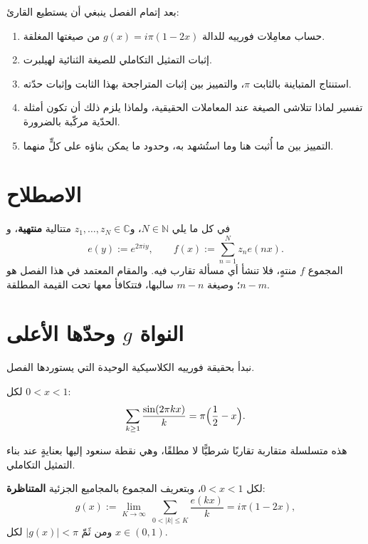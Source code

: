 بعد إتمام الفصل ينبغي أن يستطيع القارئ:
\begin{enumerate}
  \item حساب معامِلات فورييه للدالة \(g(x)=i\pi(1-2x)\) من صيغتها المغلقة.
  \item إثبات التمثيل التكاملي للصيغة الثنائية لهيلبرت.
  \item استنتاج المتباينة بالثابت \(\pi\)، والتمييز بين إثبات
  المتراجحة بهذا الثابت وإثبات حدّته.
  \item تفسير لماذا تتلاشى الصيغة عند المعاملات الحقيقية، ولماذا يلزم
  ذلك أن تكون أمثلة الحدّية مركّبة بالضرورة.
  \item التمييز بين ما أُثبت هنا وما استُشهد به، وحدود ما يمكن بناؤه على
  كلٍّ منهما.
\end{enumerate}

\section{الاصطلاح}

في كل ما يلي \(N\in\mathbb{N}\)، و\(z_1,\dots,z_N\in\mathbb{C}\) متتالية
\textbf{منتهية}، و
\[
e(y):=e^{2\pi iy},
\qquad
f(x):=\sum_{n=1}^{N}z_ne(nx).
\]
المجموع \(f\) منتهٍ، فلا تنشأ أي مسألة تقارب فيه. والمقام المعتمد في هذا
الفصل هو \(n-m\)؛ وصيغة \(m-n\) سالبها، فتتكافأ معها تحت القيمة المطلقة.

\section{النواة \texorpdfstring{\(g\)}{g} وحدّها الأعلى}

نبدأ بحقيقة فورييه الكلاسيكية الوحيدة التي يستوردها الفصل.

\begin{lemma}
\label{lem:ch58-sawtooth}
لكل \(0<x<1\):
\[
\sum_{k\ge1}\frac{\sin(2\pi kx)}{k}=\pi\Bigl(\frac12-x\Bigr).
\]
\end{lemma}

هذه متسلسلة متقاربة تقاربًا شرطيًّا لا مطلقًا، وهي نقطة سنعود إليها
بعنايةٍ عند بناء التمثيل التكاملي.

\begin{lemma}
\label{lem:ch58-kernel}
\provedhere
لكل \(0<x<1\)، وبتعريف المجموع بالمجاميع الجزئية \textbf{المتناظرة}:
\[
g(x):=\lim_{K\to\infty}\ \sum_{0<\lvert k\rvert\le K}\frac{e(kx)}{k}
=i\pi(1-2x),
\]
ومن ثَمّ \(\lvert g(x)\rvert<\pi\) لكل \(x\in(0,1)\).
\end{lemma}

